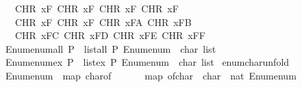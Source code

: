 \begin{isabellebody}
\ \ \ \ CHR\ {}xF{}{\isacharcomma}{\kern0pt}\ CHR\ {}xF{}{\isacharcomma}{\kern0pt}\ CHR\ {}xF{}{\isacharcomma}{\kern0pt}\ CHR\ {}xF{}{\isacharcomma}{\kern0pt}\isanewline
\ \ \ \ CHR\ {}xF{}{\isacharcomma}{\kern0pt}\ CHR\ {}xF{}{\isacharcomma}{\kern0pt}\ CHR\ {}xFA{\isacharcomma}{\kern0pt}\ CHR\ {}xFB{\isacharcomma}{\kern0pt}\isanewline
\ \ \ \ CHR\ {}xFC{\isacharcomma}{\kern0pt}\ CHR\ {}xFD{\isacharcomma}{\kern0pt}\ CHR\ {}xFE{\isacharcomma}{\kern0pt}\ CHR\ {}xFF{\isacharbrackright}{\kern0pt}{\isachardoublequoteclose}\isanewline
\isanewline
{}\isamarkupfalse%
\isanewline
\ \ {\isachardoublequoteopen}Enum{\isachardot}{\kern0pt}enum{\isacharunderscore}{\kern0pt}all\ P\ {\isasymlongleftrightarrow}\ list{\isacharunderscore}{\kern0pt}all\ P\ {\isacharparenleft}{\kern0pt}Enum{\isachardot}{\kern0pt}enum\ {\isacharcolon}{\kern0pt}{\isacharcolon}{\kern0pt}\ char\ list{\isacharparenright}{\kern0pt}{\isachardoublequoteclose}\isanewline
\isanewline
{}\isamarkupfalse%
\isanewline
\ \ {\isachardoublequoteopen}Enum{\isachardot}{\kern0pt}enum{\isacharunderscore}{\kern0pt}ex\ P\ {\isasymlongleftrightarrow}\ list{\isacharunderscore}{\kern0pt}ex\ P\ {\isacharparenleft}{\kern0pt}Enum{\isachardot}{\kern0pt}enum\ {\isacharcolon}{\kern0pt}{\isacharcolon}{\kern0pt}\ char\ list{\isacharparenright}{\kern0pt}{\isachardoublequoteclose}\isanewline
\isanewline
{}\isamarkupfalse%
\ enum{\isacharunderscore}{\kern0pt}char{\isacharunderscore}{\kern0pt}unfold{\isacharcolon}{\kern0pt}\isanewline
\ \ {\isachardoublequoteopen}Enum{\isachardot}{\kern0pt}enum\ {\isacharequal}{\kern0pt}\ map\ char{\isacharunderscore}{\kern0pt}of\ {\isacharbrackleft}{\kern0pt}{}{\isachardot}{\kern0pt}{\isachardot}{\kern0pt}{\isacharless}{\kern0pt}{}{}{}{\isacharbrackright}{\kern0pt}{\isachardoublequoteclose}\isanewline
%
\isadelimproof
%
\endisadelimproof
%
\isatagproof
{}\isamarkupfalse%
\ {\isacharminus}{\kern0pt}\isanewline
\ \ \isamarkupfalse%
\ {\isachardoublequoteopen}map\ {\isacharparenleft}{\kern0pt}of{\isacharunderscore}{\kern0pt}char\ {\isacharcolon}{\kern0pt}{\isacharcolon}{\kern0pt}\ char\ {\isasymRightarrow}\ nat{\isacharparenright}{\kern0pt}\ Enum{\isachardot}{\kern0pt}enum\ {\isacharequal}{\kern0pt}\ {\isacharbrackleft}{\kern0pt}{}{\isachardot}{\kern0pt}{\isachardot}{\kern0pt}{\isacharless}{\kern0pt}{}{}{}{\isacharbrackright}{\kern0pt}{\isachardoublequoteclose}\isanewline

\end{isabellebody}
